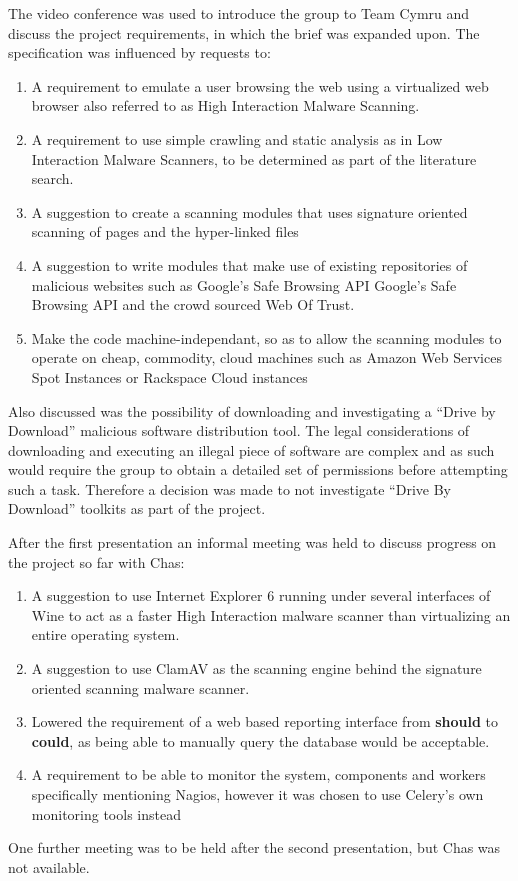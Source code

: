 The video conference was used to introduce the group to Team Cymru and discuss the project requirements, in which the brief was expanded upon. The specification was influenced by requests to:
\begin{enumerate}
    \item A requirement to emulate a user browsing the web using a virtualized web browser also referred to as High Interaction Malware Scanning.

    \item A requirement to use simple crawling and static analysis as in Low Interaction Malware Scanners, to be determined as part of the literature search.

    \item A suggestion to create a scanning modules that uses signature oriented scanning of pages and the hyper-linked files

    \item A suggestion to write modules that make use of existing repositories of malicious websites such as Google's Safe Browsing API\cite{google-safe} Google's Safe Browsing API and the crowd sourced Web Of Trust.

    \item Make the code machine-independant, so as to allow the scanning modules to operate on cheap, commodity, cloud machines such as Amazon Web Services Spot Instances\cite{aws-spot} or Rackspace Cloud instances\cite{rackspace}
\end{enumerate}

Also discussed was the possibility of downloading and investigating a ``Drive by Download'' malicious software distribution tool.  The legal considerations of downloading and executing an illegal piece of software are complex and as such would require the group to obtain a detailed set of permissions before attempting such a task. Therefore a decision was made to not investigate ``Drive By Download'' toolkits as part of the project.

After the first presentation an informal meeting was held to discuss progress on the project so far with Chas:

\begin{enumerate}
    \item A suggestion to use Internet Explorer 6 running under several interfaces of Wine to act as a faster High Interaction malware scanner than virtualizing an entire operating system.

    \item A suggestion to use ClamAV as the scanning engine behind the signature oriented scanning malware scanner.

    \item Lowered the requirement of a web based reporting interface from \textbf{should} to \textbf{could}, as being able to manually query the database would be acceptable.

    \item A requirement to be able to monitor the system, components and workers specifically mentioning Nagios, however it was chosen to use Celery's own monitoring tools instead
\end{enumerate}

One further meeting was to be held after the second presentation, but Chas was not available.

